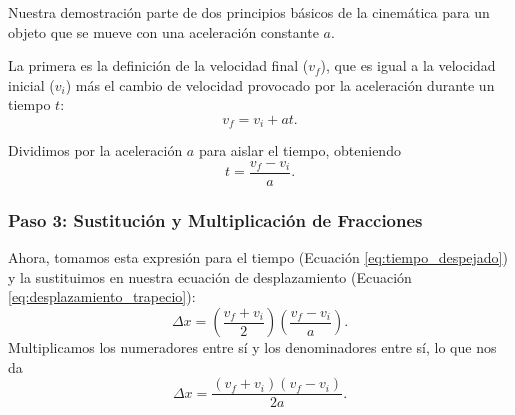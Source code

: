 \documentclass[11pt,a4paper]{book}
\begin{document}




Nuestra demostración parte de dos principios básicos de la cinemática para un objeto que se mueve con una aceleración constante $a$.

La primera es la definición de la velocidad final ($v_f$), que es igual a la velocidad inicial ($v_i$) más el cambio de velocidad provocado por la aceleración durante un tiempo $t$:
\begin{equation}
    v_f = v_i + a t.
    \label{eq:velocidad_tiempo}
\end{equation}

Dividimos por la aceleración $a$ para aislar el tiempo, obteniendo
\begin{equation}
    t = \frac{v_f - v_i}{a}.
    \label{eq:tiempo_despejado}
\end{equation}

\subsubsection{Paso 3: Sustitución y Multiplicación de Fracciones}

Ahora, tomamos esta expresión para el tiempo (Ecuación \eqref{eq:tiempo_despejado}) y la sustituimos en nuestra ecuación de desplazamiento (Ecuación \eqref{eq:desplazamiento_trapecio}):
\begin{equation}
    \Delta x = \left( \frac{v_f + v_i}{2} \right) \left( \frac{v_f - v_i}{a} \right).
\end{equation}
Multiplicamos los numeradores entre sí y los denominadores entre sí, lo que nos da
\begin{equation}
    \Delta x = \frac{(v_f + v_i)(v_f - v_i)}{2a}.
\end{equation}
\end{document}
